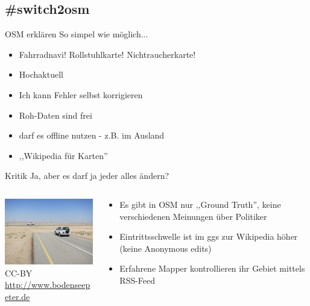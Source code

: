 \documentclass{beamer}
\begin{document}
\subsection{\#switch2osm}

\begin{frame}{OSM erklären}
	So simpel wie möglich...
	\begin{itemize}
		\item Fahrradnavi! Rollstuhlkarte! Nichtraucherkarte!
		\item Hochaktuell
		\item Ich kann Fehler selbst korrigieren
		\item Roh-Daten sind frei
		\item darf es offline nutzen - z.B. im Ausland
		\item ,,Wikipedia für Karten''
	\end{itemize}
	
\end{frame}

\begin{frame}{Kritik}
	Ja, aber es darf ja jeder alles ändern?
	\vspace{5mm}
	\begin{columns}[c]
		\begin{column}[T]{.4\textwidth}
			\includegraphics[width=4.5cm]{unconnected.jpg} \\
			{\TINY CC-BY \url{http://www.bodenseepeter.de}}
		\end{column}
		\pause
		\begin{column}[T]{.6\textwidth}
			\begin{itemize}
				\item Es gibt in OSM nur ,,Ground Truth'', keine verschiedenen Meinungen über Politiker 
				\item Eintrittsschwelle ist im ggs zur Wikipedia höher (keine Anonymous edits)
				\item Erfahrene Mapper kontrollieren ihr Gebiet mittels RSS-Feed
			\end{itemize}
		\end{column}
	\end{columns}
\end{frame}
\end{document}
